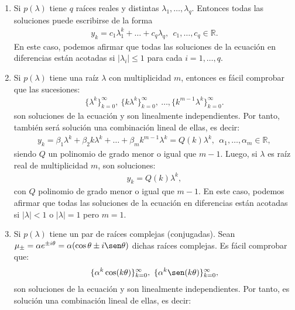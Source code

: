 \begin{enumerate}
    \item Si $p(\lambda)$ tiene $q$ raíces reales y distintas $\lambda_1,\ldots,\lambda_q$. Entonces todas las soluciones puede escribirse de la forma
          \begin{align*}
              y_k = c_1\lambda_1^k + \ldots + c_q \lambda_q, \ \ c_1,\ldots,c_q \in \mathbb{R}.
          \end{align*}
          En este caso, podemos afirmar que todas las soluciones de la ecuación en diferencias están acotadas si $|\lambda_i| \leq 1$ para cada $i = 1,\ldots,q$.
    \item Si $p(\lambda)$ tiene una raíz $\lambda$ con multiplicidad $m$, entonces es fácil comprobar que las sucesiones:
          \begin{align*}
              \{\lambda^k\}_{k=0}^{\infty}, \ \{k\lambda^k\}_{k=0}^{\infty},\ \ldots,\{k^{m-1}\lambda^k\}_{k=0}^{\infty}.
          \end{align*}
          son soluciones de la ecuación y son linealmente independientes. Por tanto, también será solución una combinación lineal de ellas, es decir: \begin{align*}
              y_k = \beta_1 \lambda^k + \beta_2 k \lambda^k + \ldots +\beta_m k^{m-1}\lambda^k = Q(k)\lambda^k, \ \ \alpha_1,\ldots,\alpha_m \in \mathbb{R},
          \end{align*}
          siendo $Q$ un polinomio de grado menor o igual que $m-1$. Luego, si $\lambda$ es raíz real de multiplicidad $m$, son soluciones:
          \begin{align*}
              y_k = Q(k)\lambda^k,
          \end{align*}
          con $Q$ polinomio de grado menor o igual que $m-1$. En este caso, podemos afirmar que todas las soluciones de la ecuación en diferencias están acotadas si $|\lambda| < 1$ o $|\lambda| = 1$ pero $m=1$.
    \item Si $p(\lambda)$ tiene un par de raíces complejas (conjugadas). Sean $\mu_{\pm} = \alpha e^{\pm i \theta} = \alpha(\cos \theta \pm i\sen\theta)$ dichas raíces complejas. Es fácil comprobar que:
          \begin{align*}
              \{\alpha^k \cos(k\theta) \}_{k=0}^{\infty}, \ \{\alpha^k \sen(k\theta) \}_{k=0}^{\infty},
          \end{align*}
          son soluciones de la ecuación y son linealmente independientes. Por tanto, es solución una combinación lineal de ellas, es decir:

\end{enumerate}
